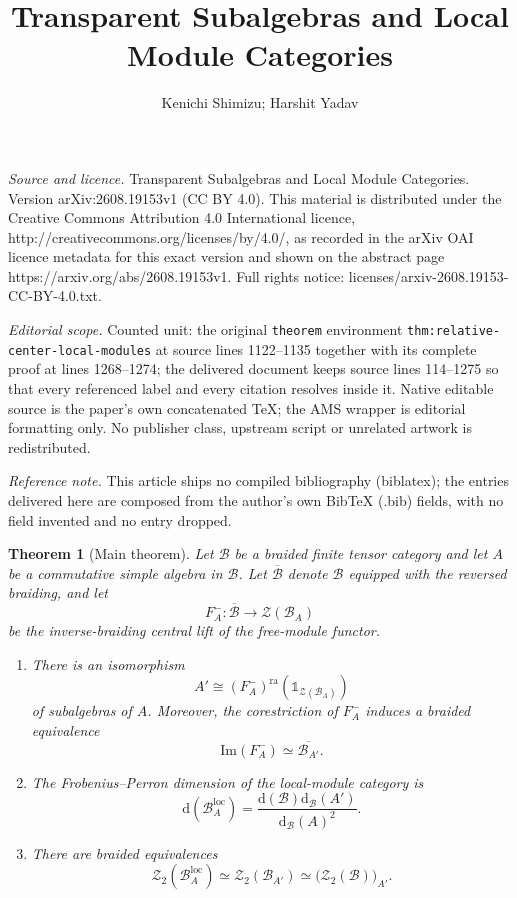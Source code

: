 \documentclass[10pt,a4paper]{amsart}
\numberwithin{equation}{section}
\newtheorem{theorem}[thmctr]{Theorem}
\newcommand{\unit}{\mathds{1}}
\newcommand{\B}{\mathcal{B}}
\newcommand{\Z}{\mathcal{Z}}
\newcommand{\loc}{\mathrm{loc}}
\newcommand{\ra}{\mathrm{ra}}
\newcommand{\im}{\mathrm{Im}}
\newcommand{\FP}{\mathrm{d}}
\newcommand{\oB}{\overline{\B}}
\begin{document}
\title[Transparent Subalgebras and Local Module Categories]{Transparent Subalgebras and Local Module Categories}
\author{Kenichi Shimizu; Harshit Yadav}
\date{}
\maketitle
\noindent\emph{Source and licence.} Transparent Subalgebras and Local Module Categories. Version arXiv:2608.19153v1 (CC BY 4.0). This material is distributed under the Creative Commons Attribution 4.0 International licence, http://creativecommons.org/licenses/by/4.0/, as recorded in the arXiv OAI licence metadata for this exact version and shown on the abstract page https://arxiv.org/abs/2608.19153v1. Full rights notice: licenses/arxiv-2608.19153-CC-BY-4.0.txt.\par\smallskip
\noindent\textit{Editorial scope.} Counted unit: the original \texttt{theorem} environment \texttt{thm:relative-center-local-modules} at source lines 1122--1135 together with its complete proof at lines 1268--1274; the delivered document keeps source lines 114--1275 so that every referenced label and every citation resolves inside it. Native editable source is the paper's own concatenated TeX; the AMS wrapper is editorial formatting only. No publisher class, upstream script or unrelated artwork is redistributed.
\par\smallskip\noindent\textit{Reference note.} This article ships no compiled bibliography (biblatex); the entries delivered here are composed from the author's own BibTeX (.bib) fields, with no field invented and no entry dropped.
\begin{theorem}[Main theorem]\label{thm:main}
Let $\B$ be a braided finite tensor category and let $A$ be a commutative
simple algebra in $\B$. Let $\oB$ denote $\B$ equipped with the reversed
braiding, and let
\[
  F_A^-:\oB\longrightarrow\Z(\B_A)
\]
be the inverse-braiding central lift of the free-module functor. 
\begin{enumerate}
  \item There is an isomorphism
  \[
    A' \cong (F_A^-)^{\ra}(\unit_{\Z(\B_A)})
  \]
  of subalgebras of $A$. Moreover, the corestriction of $F_A^-$ induces a
  braided equivalence
  \[
    \im(F_A^-) \simeq \overline{\B_{A'}}.
  \]
  \item The Frobenius--Perron dimension of the local-module category is
  \[
    \FP(\B_A^{\loc})
    =
    \frac{\FP(\B)\FP_{\B}(A')}{\FP_{\B}(A)^2}.
  \]
  \item There are braided equivalences
  \[
    \Z_2(\B_A^{\loc})
    \simeq
    \Z_2(\B_{A'})
    \simeq
    \bigl(\Z_2(\B)\bigr)_{A'}.
  \]
\end{enumerate}
\end{theorem}
\end{document}
